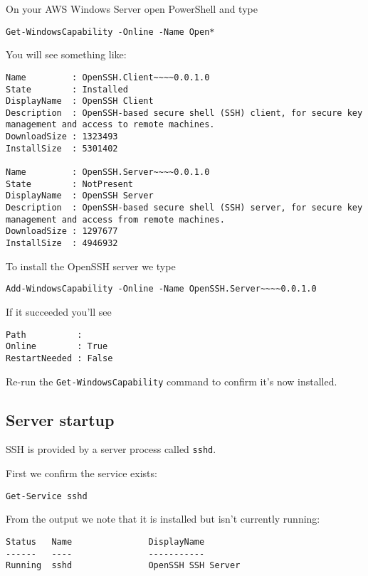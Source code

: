On your AWS Windows Server open PowerShell and type

\begin{verbatim}
Get-WindowsCapability -Online -Name Open*
\end{verbatim}

You will see something like:

\begin{verbatim}
Name         : OpenSSH.Client~~~~0.0.1.0
State        : Installed
DisplayName  : OpenSSH Client
Description  : OpenSSH-based secure shell (SSH) client, for secure key management and access to remote machines.
DownloadSize : 1323493
InstallSize  : 5301402

Name         : OpenSSH.Server~~~~0.0.1.0
State        : NotPresent
DisplayName  : OpenSSH Server
Description  : OpenSSH-based secure shell (SSH) server, for secure key management and access from remote machines.
DownloadSize : 1297677
InstallSize  : 4946932
\end{verbatim}

To install the OpenSSH server we type

\begin{verbatim}
Add-WindowsCapability -Online -Name OpenSSH.Server~~~~0.0.1.0
\end{verbatim}

If it succeeded you'll see

\begin{verbatim}
Path          :
Online        : True
RestartNeeded : False
\end{verbatim}

Re-run the \texttt{Get-WindowsCapability} command to confirm it's now
installed.

\subsection{Server startup}\label{server-startup}

SSH is provided by a server process called \texttt{sshd}.

First we confirm the service exists:

\begin{verbatim}
Get-Service sshd
\end{verbatim}

From the output we note that it is installed but isn't currently
running:

\begin{verbatim}
Status   Name               DisplayName
------   ----               -----------
Running  sshd               OpenSSH SSH Server
\end{verbatim}

